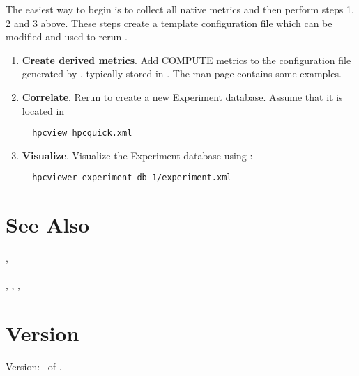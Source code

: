 \documentclass[english]{article}
\begin{document}
The easiest way to begin is to collect all native metrics and then perform steps 1, 2 and 3 above.
These steps create a template  configuration file which can be modified and used to rerun .

\begin{enumerate}
\item \textbf{Create derived metrics}.  Add COMPUTE metrics to the  configuration file generated by , typically stored in .  The  man page contains some examples. 

\item \textbf{Correlate}. Rerun  to create a new Experiment database.  Assume that it is located in 
\begin{verbatim}
  hpcview hpcquick.xml
\end{verbatim}

\item \textbf{Visualize}.
Visualize the Experiment database using :
\begin{verbatim}
  hpcviewer experiment-db-1/experiment.xml
\end{verbatim}

\end{enumerate}



\section{See Also}

,  \\
 \\
, , ,  \\ %

\section{Version}

Version: \Version\ of \Date.
\end{document}
